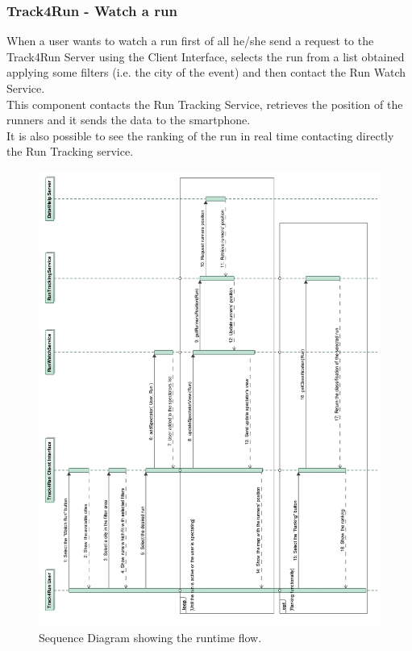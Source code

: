 \documentclass[a4paper]{article}
\begin{document}
\subsubsection{Track4Run - Watch a run}
When a user wants to watch a run first of all he/she send a request to the Track4Run Server using the Client Interface, selects the run from a list obtained applying some filters (i.e. the city of the event) and then contact the Run Watch Service. \\
This component contacts the Run Tracking Service, retrieves the position of the runners and it sends the data to the smartphone. \\
It is also possible to see the ranking of the run in real time contacting directly the Run Tracking service.

\begin{figure}[H]
    \centering
    \includegraphics[width=\linewidth]{SequenceDiagram-SpectateARunEvent}
    \caption{Sequence Diagram showing the runtime flow.}
    \label{fig:my_label}
\end{figure}
\clearpage
\end{document}
